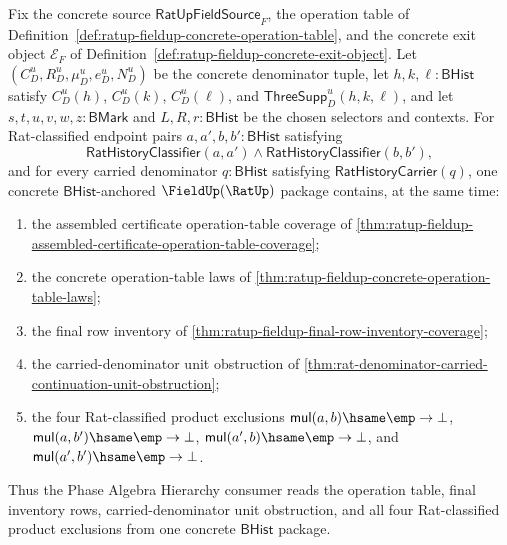 \begin{theorem}
\label{thm:ratup-fieldup-operation-table-final-inventory-four-endpoint-coverage}
Fix the concrete source $\mathsf{RatUpFieldSource}_F$, the operation table of
Definition~\ref{def:ratup-fieldup-concrete-operation-table}, and the concrete
exit object $\mathcal E_F$ of
Definition~\ref{def:ratup-fieldup-concrete-exit-object}. Let
$(C_D^u,R_D^u,\mu_D^u,e_D^u,N_D^u)$ be the concrete denominator tuple, let
$h,k,\ell:\mathsf{BHist}$ satisfy $C_D^u(h)$, $C_D^u(k)$, $C_D^u(\ell)$, and
$\mathsf{ThreeSupp}_D^u(h,k,\ell)$, and let
$s,t,u,v,w,z:\mathsf{BMark}$ and $L,R,r:\mathsf{BHist}$ be the chosen selectors
and contexts. For Rat-classified endpoint pairs
$a,a',b,b':\mathsf{BHist}$ satisfying
$$
\mathsf{RatHistoryClassifier}(a,a')
\land
\mathsf{RatHistoryClassifier}(b,b'),
$$
and for every carried denominator $q:\mathsf{BHist}$ satisfying
$\mathsf{RatHistoryCarrier}(q)$, one concrete $\mathsf{BHist}$-anchored
$\FieldUp(\RatUp)$ package contains, at the same time:
\begin{enumerate}
  \item the assembled certificate operation-table coverage of
  \autoref{thm:ratup-fieldup-assembled-certificate-operation-table-coverage};
  \item the concrete operation-table laws of
  \autoref{thm:ratup-fieldup-concrete-operation-table-laws};
  \item the final row inventory of
  \autoref{thm:ratup-fieldup-final-row-inventory-coverage};
  \item the carried-denominator unit obstruction of
  \autoref{thm:rat-denominator-carried-continuation-unit-obstruction};
  \item the four Rat-classified product exclusions
  $\mathsf{mul}(a,b)\hsame\emp\to\bot$,
  $\mathsf{mul}(a,b')\hsame\emp\to\bot$,
  $\mathsf{mul}(a',b)\hsame\emp\to\bot$, and
  $\mathsf{mul}(a',b')\hsame\emp\to\bot$.
\end{enumerate}
Thus the Phase Algebra Hierarchy consumer reads the operation table, final
inventory rows, carried-denominator unit obstruction, and all four
Rat-classified product exclusions from one concrete $\mathsf{BHist}$ package.
\end{theorem}
